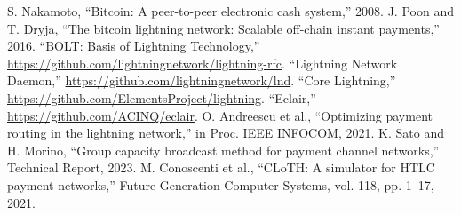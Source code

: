 \documentclass[conference]{IEEEtran}
\begin{document}
\begin{thebibliography}{00}
	 S. Nakamoto, ``Bitcoin: A peer-to-peer electronic cash system,'' 2008.
	 J. Poon and T. Dryja, ``The bitcoin lightning network: Scalable off-chain instant payments,'' 2016.
	 ``BOLT: Basis of Lightning Technology,'' \url{https://github.com/lightningnetwork/lightning-rfc}.
	 ``Lightning Network Daemon,'' \url{https://github.com/lightningnetwork/lnd}.
	 ``Core Lightning,'' \url{https://github.com/ElementsProject/lightning}.
	 ``Eclair,'' \url{https://github.com/ACINQ/eclair}.
	 O. Andreescu et al., ``Optimizing payment routing in the lightning network,'' in Proc. IEEE INFOCOM, 2021.
	 K. Sato and H. Morino, ``Group capacity broadcast method for payment channel networks,'' Technical Report, 2023.
	 M. Conoscenti et al., ``CLoTH: A simulator for HTLC payment networks,'' Future Generation Computer Systems, vol. 118, pp. 1--17, 2021.
\end{thebibliography}
\end{document}
